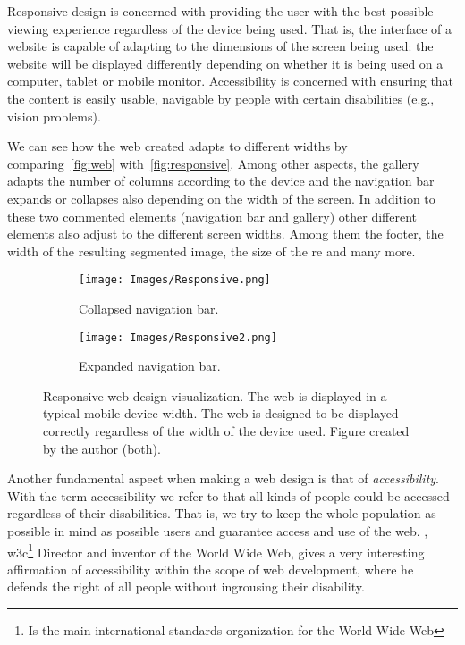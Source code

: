 Responsive design is concerned with providing the user with the best possible
viewing experience regardless of the device being used. That is, the interface
of a website is capable of adapting to the dimensions of the screen being used:
the website will be displayed differently depending on whether it is being used
on a computer, tablet or mobile monitor. Accessibility is concerned with
ensuring that the content is easily usable, navigable by people with certain
disabilities (e.g., vision problems).

We can see how the web created adapts to different widths by comparing\
\vref{fig:web} with\ \vref{fig:responsive}. Among other aspects, the gallery
adapts the number of columns according to the device and the navigation bar
expands or collapses also depending on the width of the screen. In addition to
these two commented elements (navigation bar and gallery) other different
elements also adjust to the different screen widths. Among them the footer, the
width of the resulting segmented image, the size of the \gls{re} and many more.

\begin{figure}[ht]
  \centering
  \begin{subfigure}[t]{.5\textwidth}
    \centering
    \caption{Collapsed navigation bar.}
    \texttt{[image: Images/Responsive.png]}
  \end{subfigure}\hfill
  \begin{subfigure}[t]{.5\textwidth}
    \centering
    \caption{Expanded navigation bar.}
    \texttt{[image: Images/Responsive2.png]}
  \end{subfigure}
  \caption[Responsive web design visualization]{Responsive web design
    visualization. The web is displayed in a typical mobile device width. The
    web is designed to be displayed correctly regardless of the width of the
    device used. Figure created by the author (both).}%
  \label{fig:responsive}
\end{figure}

Another fundamental aspect when making a web design is that of
\emph{accessibility}. With the term accessibility we refer
to that all kinds of people could be accessed regardless of their
disabilities. That is, we try to keep the whole population as possible in mind
as possible users and guarantee access and use of the
web. , \gls{w3c}\footnote{Is the main
  international standards organization for the World Wide Web} Director and
inventor of the World Wide Web, gives a very interesting affirmation of
accessibility within the scope of web development, where he defends the right
of all people without ingrousing their disability.

